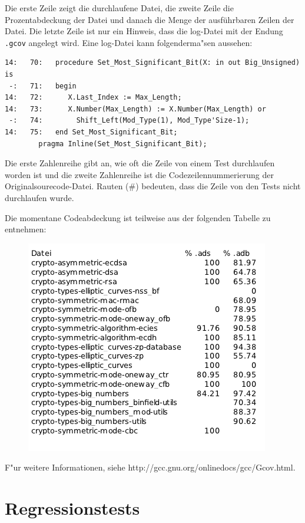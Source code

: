 Die erste Zeile zeigt die durchlaufene Datei, die zweite Zeile die
Prozentabdeckung der Datei und danach die Menge der ausführbaren
Zeilen der Datei. Die letzte Zeile ist nur ein Hinweis, dass die
log-Datei mit der Endung {\tt .gcov} angelegt wird.  Eine log-Datei
kann folgenderma"sen aussehen:
\begin{lstlisting} 
14:   70:   procedure Set_Most_Significant_Bit(X: in out Big_Unsigned) is
 -:   71:   begin
14:   72:      X.Last_Index := Max_Length;
14:   73:      X.Number(Max_Length) := X.Number(Max_Length) or
 -:   74:        Shift_Left(Mod_Type(1), Mod_Type'Size-1);
14:   75:   end Set_Most_Significant_Bit; 
	    pragma Inline(Set_Most_Significant_Bit);
\end{lstlisting}

Die erste Zahlenreihe gibt an, wie oft die Zeile von einem Test
durchlaufen worden ist und die zweite Zahlenreihe ist die
Codezeilennummerierung der Originalsourecode-Datei.  Rauten (\#)
bedeuten, dass die Zeile von den Tests nicht durchlaufen wurde.

Die momentane Codeabdeckung ist teilweise aus der folgenden Tabelle zu
entnehmen:
\begin{figure}[htp]
\centering
\includegraphics[width=\textwidth]{./images/tabelle_gcov}
\caption{}
\label{fig:gcov}
\end{figure}

F"ur weitere Informationen, siehe http://gcc.gnu.org/onlinedocs/gcc/Gcov.html.
\chapter{Regressionstests}

